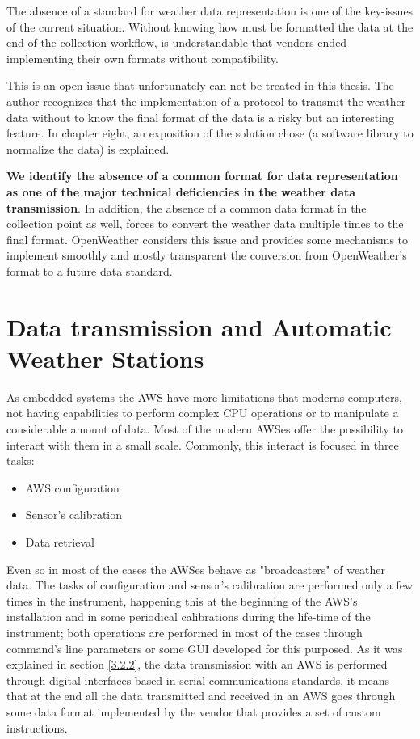 The absence of a standard for weather data representation is one of the key-issues of the current situation. Without knowing how must be formatted the data at the end of the collection workflow, is understandable that vendors ended implementing their own formats without compatibility. 

This is an open issue that unfortunately can not be treated in this thesis. The author recognizes that the implementation of a protocol to transmit the weather data without to know the final format of the data is a risky but an interesting feature. In chapter eight, an exposition of the solution chose (a software library to normalize the data) is explained.

\textbf{We identify the absence of a common format for data representation as one of the major technical deficiencies in the weather data transmission}. In addition, the absence of a common data format in the collection point as well, forces to convert the weather data multiple times to the final format. OpenWeather considers this issue and provides some mechanisms to implement smoothly and mostly transparent the conversion from OpenWeather's format to a future data standard.

\section{Data transmission and Automatic \\ Weather Stations}

As embedded systems the \gls{AWS} have more limitations that moderns computers, not having capabilities to perform complex \gls{CPU} operations or to manipulate a considerable amount of data. Most of the modern \gls{AWS}es offer the possibility to interact with them in a small scale. Commonly, this interact is focused in three tasks:

\begin{itemize}
\item AWS configuration
\item Sensor's calibration
\item Data retrieval
\end{itemize}

Even so in most of the cases the \gls{AWS}es behave as "broadcasters" of weather data. The tasks of configuration and sensor's calibration are performed only a few times in the instrument, happening this at the beginning of the \gls{AWS}'s installation and in some periodical calibrations during the life-time of the instrument; both operations are performed in most of the cases through command's line parameters or some \gls{GUI} developed for this purposed. As it was explained in section \ref{3.2.2}, the data transmission with an \gls{AWS} is performed through digital interfaces based in serial communications standards, it means that at the end all the data transmitted and received in an \gls{AWS} goes through some data format implemented by the vendor that provides a set of custom instructions. 

